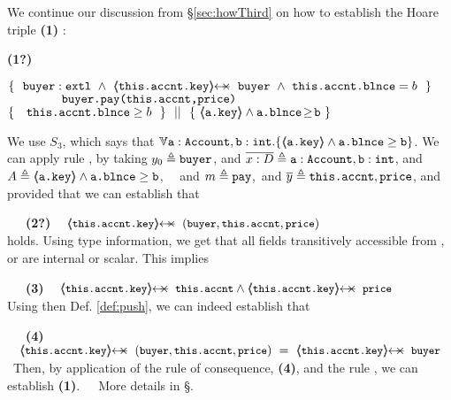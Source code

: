 \begin{example}
We continue our discussion from \S \ref{sec:howThird} on how to establish the Hoare triple    \textbf{(1)} :

 \vspace{.05cm}
  \begin{minipage}{.05\textwidth}
   \textbf{(1?)}\ \ 
\end{minipage}
\hfill
\begin{minipage}{.95\textwidth}
\begin{flushleft}
$\{\  \   \external{\prg{buyer}} \ \wedge\ 
   {\protectedFrom {\prg{this.\myAccount.key}}  {\prg{buyer} } }
 \ \wedge\ \prg{this.\myAccount.\balance}= b  \ \  \}$\\
$\ \ \ \ \ \ \ \ \ \ \ \ {\ \mbox{\normalfont{\texttt{buyer.pay(this.accnt,price)}}}   \ } $\\
$  \{\  \ \  {\mbox{\normalfont{\texttt{this.\mbox{\normalfont{\texttt{accnt}}}.\mbox{\normalfont{\texttt{blnce}}}}}}} \geq  b \  \  \} \ \ ||\ \  \{\ \langle\!\!\langle \mbox{\normalfont{\texttt{a.key}}} \rangle\!\!\rangle\wedge  \mbox{\normalfont{\texttt{a.\mbox{\normalfont{\texttt{blnce}}}}}}\!\geq\!{\mbox{\normalfont{\texttt{b}}}}   \ \}  $ 
\end{flushleft}
\end{minipage}
 
\vspace{.03cm}
\noindent
We use $S_3$, which says that $\TwoStatesN{ \prg{a}:\prg{Account},\prg{b}:\prg{int} } {\inside{\prg{a.key}} \wedge \prg{a.\balance} \geq \prg{b} }$. 
We can apply rule {}, by taking  $y_0 \triangleq \mbox{\normalfont{\texttt{buyer}}}$,  and $\overline {x : D}\triangleq \mbox{\normalfont{\texttt{a}}}:\mbox{\normalfont{\texttt{Account}}},\mbox{\normalfont{\texttt{b}}}:\mbox{\normalfont{\texttt{int}}}$, 
and $A \triangleq  \langle\!\!\langle \mbox{\normalfont{\texttt{a.key}}} \rangle\!\!\rangle\wedge \mbox{\normalfont{\texttt{a.\mbox{\normalfont{\texttt{blnce}}}}}}\geq \mbox{\normalfont{\texttt{b}}}$, \ \ 
and $m \triangleq \mbox{\normalfont{\texttt{pay}}}$,\ and $\overline {y} \triangleq \mbox{\normalfont{\texttt{this.accnt}}},\mbox{\normalfont{\texttt{price}}}$,
and provided that we can establish that\\
\strut \ \ \   \textbf{(2?)}  $ {\small{\strut \ \ \ \protectedFrom {} {(\prg{buyer},\prg{this.\myAccount},)}}}$\\
holds. Using type information, we get that all fields transitively accessible from \prg{this.\myAccount.key}, or \prg{price} are internal or scalar. This implies\\
\strut \ \ \   \textbf{(3)}  $ {\small{\strut \ \ \ \protectedFrom {\prg{this.\myAccount.key}} {\prg{this.\myAccount}} \wedge  \protectedFrom {\prg{this.\myAccount.key}} {\prg{price}}}} $\\
Using then    Def. \ref{def:push},  we can indeed establish that\\
\strut \ \ \   \textbf{(4)} $ {\small{\strut \ \ \ \protectedFrom {\prg{this.\myAccount.key}} {(\prg{buyer},\prg{this.\myAccount},\prg{price})}  \ = \   \protectedFrom {\prg{this.\myAccount.key}} {\prg{buyer}}}}$\
Then, by application of the rule of consequence, \textbf{(4)}, and the rule {}, we can establish \textbf{(1)}.\ \ \ 
More details in \S  {}.
\end{example}

